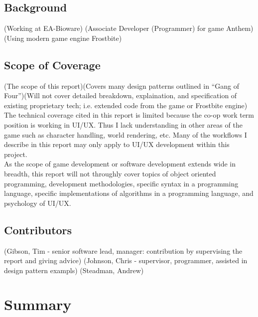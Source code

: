 \documentclass[10pt,letterpaper]{article}
\newcommand{\bs}{\bigskip}
\begin{document}
\subsection*{Background}

(Working at EA-Bioware)
(Associate Developer (Programmer) for game Anthem)
(Using modern game engine Frostbite)

\subsection*{Scope of Coverage}

(The scope of this report)(Covers many design patterns outlined in ``Gang of Four'')(Will not cover detailed breakdown, explaination, and specification of existing proprietary tech; i.e. extended code from the game or Frostbite engine)\bs
\\
The technical coverage cited in this report is limited because the co-op work term position is working in UI/UX. Thus I lack understanding in other areas of the game such as character handling, world rendering, etc. Many of the workflows I describe in this report may only apply to UI/UX development within this project.\bs
\\
As the scope of game development or software development extends wide in breadth, this report will not throughly cover topics of object oriented programming, development methodologies, specific syntax in a programming language, specific implementations of algorithms in a programming language, and psychology of UI/UX.

\subsection*{Contributors}

(Gibson, Tim - senior software lead, manager: contribution by supervising the report and giving advice) 
(Johnson, Chris - supervisor, programmer, assisted in design pattern exampls)
(Steadman, Andrew)

\newpage

\section*{Summary}
\newpage
\end{document}
